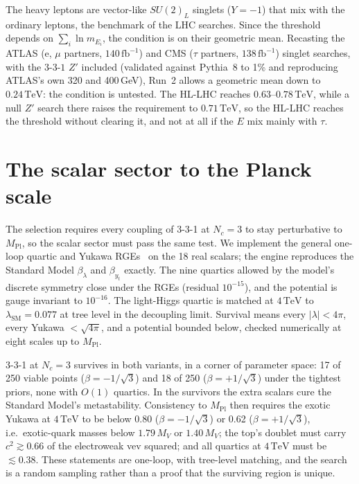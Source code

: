 \documentclass[11pt,a4paper]{article}
\newcommand{\Nc}{N_c}
\newcommand{\MPl}{M_{\mathrm{Pl}}}
\newcommand{\TeV}{\,\mathrm{TeV}}
\begin{document}
The heavy leptons are vector-like $SU(2)_L$ singlets ($Y=-1$) that mix with the ordinary
leptons, the benchmark of the LHC searches. Since the threshold depends on
$\sum_i\ln m_{E_i}$, the condition is on their geometric mean. Recasting the ATLAS (e, $\mu$
partners, $140\,\text{fb}^{-1}$) and CMS ($\tau$ partners, $138\,\text{fb}^{-1}$) singlet
searches, with the $3$-$3$-$1$ $Z'$ included (validated against Pythia~8 to 1\% and
reproducing ATLAS's own 320 and 400\,GeV), Run~2 allows a geometric mean down to
$0.24\TeV$: the condition is untested. The HL-LHC reaches $0.63$--$0.78\TeV$, while a null
$Z'$ search there raises the requirement to $0.71\TeV$, so the HL-LHC reaches the
threshold without clearing it, and not at all if the $E$ mix mainly with $\tau$.

\section{The scalar sector to the Planck scale}\label{sec:scalar}

The selection requires every coupling of 3-3-1 at $\Nc=3$ to stay perturbative to $\MPl$,
so the scalar sector must pass the same test. We implement the general one-loop quartic
and Yukawa RGEs~\cite{Machacek:1983fi,Machacek:1984zw,Luo:2002ti} on the 18 real scalars;
the engine reproduces the Standard Model $\beta_\lambda$ and $\beta_{y_t}$ exactly. The
nine quartics allowed by the model's discrete symmetry close under the RGEs (residual
$10^{-15}$), and the potential is gauge invariant to $10^{-16}$. The light-Higgs quartic is
matched at $4\TeV$ to $\lambda_{\text{SM}}=0.077$ at tree level in the decoupling limit.
Survival means every $|\lambda|<4\pi$, every Yukawa $<\sqrt{4\pi}$, and a potential
bounded below, checked numerically at eight scales up to $\MPl$.

3-3-1 at $\Nc=3$ survives in both variants, in a corner of parameter space: 17 of 250
viable points ($\beta=-1/\sqrt3$) and 18 of 250 ($\beta=+1/\sqrt3$) under the tightest priors,
none with $O(1)$ quartics. In the survivors the extra scalars cure the Standard Model's
metastability. Consistency to $\MPl$ then requires the exotic Yukawa at $4\TeV$ to be
below 0.80 ($\beta=-1/\sqrt3$) or 0.62 ($\beta=+1/\sqrt3$), i.e.\ exotic-quark masses below
$1.79\,M_V$ or $1.40\,M_V$; the top's doublet must carry $c^2\gtrsim0.66$ of the
electroweak vev squared; and all quartics at $4\TeV$ must be $\lesssim0.38$. These
statements are one-loop, with tree-level matching, and the search is a random sampling
rather than a proof that the surviving region is unique.
\end{document}
